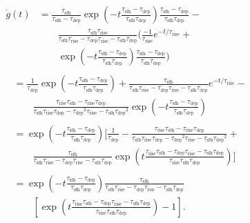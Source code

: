 \documentclass[12pt]{article}
\newcommand{\timescale}[1]{\ensuremath{\tau_\text{#1}}}
\begin{document}
\begin{subequations}\begin{align}
\begin{split} %
\dot{g}(t) &= \frac{\timescale{sfh}}{\timescale{sfh} - \timescale{dep}}
\exp \left( -t \frac{
	\timescale{sfh} - \timescale{dep}
}{
	\timescale{sfh}\timescale{dep}
}\right)\frac{
	\timescale{sfh} - \timescale{dep}
}{
	\timescale{sfh}\timescale{dep}
} - 
\\
&\qquad \frac{
	\timescale{sfh}\timescale{rise}
}{
	\timescale{sfh}\timescale{rise} - \timescale{dep}\timescale{rise} -
	\timescale{sfh}\timescale{dep}
} \bigg(
\frac{-1}{\timescale{rise}} e^{-t / \timescale{rise}} +
\\
&\qquad
\exp \left( -t \frac{
	\timescale{sfh} - \timescale{dep}
}{
	\timescale{sfh}\timescale{dep}
}
\right)
\frac{
	\timescale{sfh} - \timescale{dep}
}{
	\timescale{sfh}\timescale{dep}
}
\bigg)
\end{split}
\\
\begin{split} %
&= \frac{1}{\timescale{dep}}\exp\left( -t \frac{
	\timescale{sfh} - \timescale{dep}
}{
	\timescale{sfh}\timescale{dep}
}\right) + \frac{
	\timescale{sfh}
}{
	\timescale{sfh}\timescale{rise} - \timescale{dep}\timescale{rise} -
	\timescale{sfh}\timescale{dep}
} e^{-t / \timescale{rise}} -
\\
&\qquad \frac{
	\timescale{rise}\timescale{sfh} - \timescale{rise}\timescale{dep}
}{
	\timescale{sfh}\timescale{rise}\timescale{dep} - \timescale{dep}^2
	\timescale{rise} - \timescale{sfh}\timescale{dep}^2
} \exp \left( -t \frac{
	\timescale{sfh} - \timescale{dep}
}{
	\timescale{sfh}\timescale{dep}
}
\right)
\end{split}
\\
\begin{split} %
&= \exp\left(-t \frac{
	\timescale{sfh} - \timescale{dep}
}{
	\timescale{sfh}\timescale{dep}
}\right) \bigg[
\frac{1}{\timescale{dep}} - \frac{
	\timescale{rise}\timescale{sfh} - \timescale{rise}\timescale{dep}
}{
	\timescale{sfh}\timescale{rise}\timescale{dep} - \timescale{dep}^2
	\timescale{rise} - \timescale{sfh}\timescale{dep}^2
} +
\\
&\qquad \frac{
	\timescale{sfh}
}{
	\timescale{sfh}\timescale{rise} - \timescale{dep}\timescale{rise} -
	\timescale{sfh}\timescale{dep}
} \exp \left(t \frac{
	\timescale{rise}\timescale{sfh} - \timescale{dep}\timescale{rise} -
	\timescale{sfh}\timescale{dep}
}{
	\timescale{rise}\timescale{sfh}\timescale{dep}
}\right) \bigg]
\end{split}
\\
\begin{split} %
&= \exp\left(-t \frac{
	\timescale{sfh} - \timescale{dep}
}{
	\timescale{sfh}\timescale{dep}
}\right) \frac{
	\timescale{sfh}
}{
	\timescale{sfh}\timescale{rise} - \timescale{dep}\timescale{rise} -
	\timescale{sfh}\timescale{dep}
}
\\
&\qquad \left[\exp\left(t \frac{
	\timescale{rise}\timescale{sfh} - \timescale{dep}\timescale{rise} -
	\timescale{sfh}\timescale{dep}
}{
	\timescale{rise}\timescale{sfh}\timescale{dep}
}\right)
- 1\right].
\end{split}
\end{align}\end{subequations}
\end{document}
